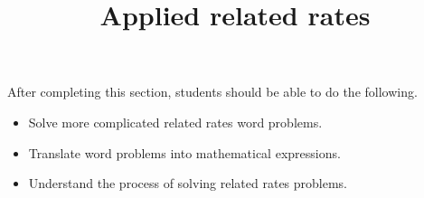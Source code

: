\documentclass{ximera}
\title{Applied related rates}
\begin{document}
\begin{abstract}
\end{abstract}

\maketitle

\begin{sectionOutcomes}

After completing this section, students should be able to do the following.

\begin{itemize}
	\item Solve more complicated related rates word problems.
	\item Translate word problems into mathematical expressions.
	\item Understand the process of solving related rates problems.
\end{itemize}

\end{sectionOutcomes}
\end{document}
